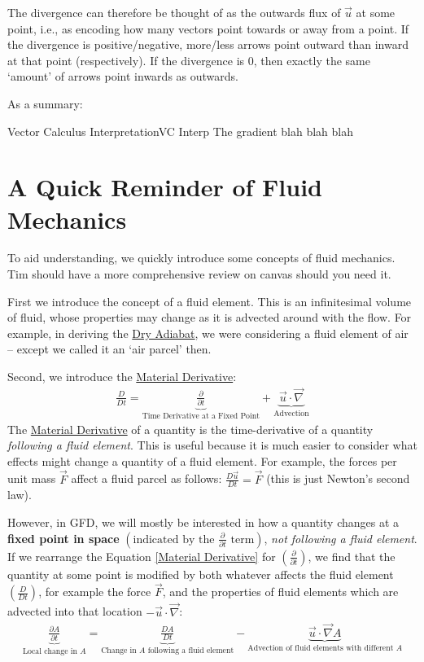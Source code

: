 The divergence can therefore be thought of as the outwards flux of $\vec{u}$ at some point, i.e., as encoding how many vectors point towards or away from a point. If the divergence is positive/negative, more/less arrows point outward than inward at that point (respectively). If the divergence is $0$, then exactly the same `amount' of arrows point inwards as outwards. 

As a summary:
\begin{fact}{Vector Calculus Interpretation}{VC Interp}\label{VC Interp}
    The gradient blah blah blah
\end{fact}

\section{A Quick Reminder of Fluid Mechanics}

To aid understanding, we quickly introduce some concepts of fluid mechanics. Tim should have a more comprehensive review on canvas should you need it.

First we introduce the concept of a fluid element. This is an infinitesimal volume of fluid, whose properties may change as it is advected around with the flow. For example, in deriving the \hyperref[Dry Adiabat]{Dry Adiabat}, we were considering a fluid element of air – except we called it an `air parcel' then.

Second, we introduce the \hyperref[Material Derivative]{Material Derivative}:
\begin{align}
    \frac{D}{Dt}=\underbrace{\frac{\partial}{\partial t}}_{\text{Time Derivative at a Fixed Point}}+\underbrace{\vec{u}\cdot\vec{\nabla}}_{\text{Advection}}
    \label{Material Derivative}
\end{align}
The \hyperref[Material Derivative]{Material Derivative} of a quantity is the time-derivative of a quantity \textit{following a fluid element}. This is useful because it is much easier to consider what effects might change a quantity of a fluid element. For example, the forces per unit mass $\vec{F}$ affect a fluid parcel as follows: $\frac{D\vec{u}}{Dt}=\vec{F}$ (this is just Newton's second law).

However, in GFD, we will mostly be interested in how a quantity changes at a \textbf{fixed point in space} $\left(\text{indicated by the } \frac{\partial}{\partial t} \text{ term}\right)$, \textit{not following a fluid element}. If we rearrange the Equation \ref{Material Derivative} for $\left( \frac{\partial}{\partial t} \right)$, we find that the quantity at some point is modified by both whatever affects the fluid element $\left( \frac{D}{D t} \right)$, for example the force $\vec{F}$, and the properties of fluid elements which are advected into that location $-\vec{u}\cdot\vec{\nabla}$:
\begin{align}\label{MatDerivTerms}
    \underbrace{\frac{\partial A}{\partial t}}_{\text{Local change in }A}=
    \underbrace{\frac{DA}{Dt}}_{{\text{Change in }A \text{ following a fluid element}}}-
    \underbrace{\vec{u}\cdot\vec{\nabla}A}_{\text{Advection of fluid elements with different }A}
\end{align}

